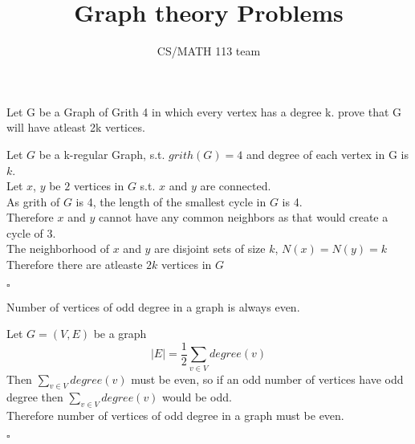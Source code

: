 \documentclass{exam}
\title{Graph theory Problems}
\author{CS/MATH 113 team}
\begin{document}
\maketitle

\begin{questions}
    \question Let G be a Graph of Grith 4 in which every vertex has a degree k. 
    prove that G will have atleast 2k vertices. 
    \begin{solution}
        Let $G$ be a k-regular Graph, s.t. $grith(G) = 4$ and degree of each vertex in G is $k$. 
        \\Let $x$, $y$ be $2$ vertices in $G$ s.t. $x$ and $y$ are connected. 
        \\As grith of $G$ is 4, the length of the smallest cycle in $G$ is 4.
        \\Therefore $x$ and $y$ cannot have any common neighbors as that would create a cycle of 3. 
        \\The neighborhood of $x$ and $y$ are disjoint sets of size $k$, $N(x) = N(y) = k$
        \\Therefore there are atleaste $2k$ vertices in $G$
        \begin{flushright}
            $\square$
        \end{flushright}
    \end{solution}

    \question Number of vertices of odd degree in a graph is always even.
    \begin{solution}
        Let $G = (V,E)$ be a graph
        $$|E| = \frac{1}{2}\sum\limits_{v\in V} degree(v)$$
        Then $\sum\limits_{v\in V} degree(v)$ must be even, so if an odd number of vertices have odd degree then $\sum\limits_{v\in V} degree(v)$ would be odd.
        \\Therefore number of vertices of odd degree in a graph must be even.
        \begin{flushright}
            $\square$
        \end{flushright}
    \end{solution}
    

\end{questions}
\end{document}
